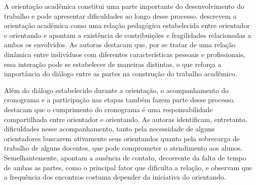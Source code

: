 A orientação acadêmica constitui uma parte importante do desenvolvimento do trabalho e pode apresentar dificuldades ao longo desse processo. descrevem a orientação acadêmica como uma relação pedagógica estabelecida entre orientador e orientando e apontam a existência de contribuições e fragilidades relacionadas a ambos os envolvidos. As autoras destacam que, por se tratar de uma relação dinâmica entre indivíduos com diferentes características pessoais e profissionais, essa interação pode se estabelecer de maneiras distintas, o que reforça a importância do diálogo entre as partes na construção do trabalho acadêmico.

Além do diálogo estabelecido durante a orientação, o acompanhamento do cronograma e a participação nas etapas também fazem parte desse processo.  destacam que o cumprimento do cronograma é uma responsabilidade compartilhada entre orientador e orientando. As autoras identificam, entretanto, dificuldades nesse acompanhamento, tanto pela necessidade de alguns orientadores buscarem ativamente seus orientandos quanto pela sobrecarga de trabalho de alguns docentes, que pode comprometer o atendimento aos alunos. Semelhantemente,  apontam a ausência de contato, decorrente da falta de tempo de ambas as partes, como o principal fator que dificulta a relação, e observam que a frequência dos encontros costuma depender da iniciativa do orientando.



